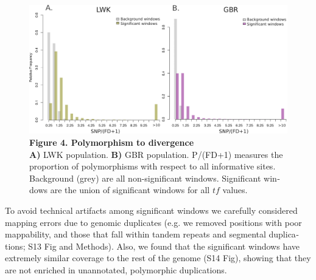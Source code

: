 \begin{refsection}
\begin{otherlanguage}{english}
\begin{figure}[!ht]
\includegraphics[width=\textwidth]{chap2_folder/Figures/Fig4.tiff}
\caption*{\textbf{Figure 4. Polymorphism to divergence}\\
\textbf{A)} LWK population. \textbf{B)} GBR population. P/(FD+1) measures the proportion of polymorphisms with respect to all informative sites. Background (grey) are all non-significant windows. Significant windows are the union of significant windows for all $tf$ values.
}
\end{figure}

To avoid technical artifacts among significant windows we carefully considered mapping errors due to genomic duplicates (e.g. we removed positions with poor mappability, and those that fall within tandem repeats and segmental duplications; S13 Fig and Methods). Also, we found that the significant windows have extremely similar coverage to the rest of the genome (S14 Fig), showing that they are not enriched in unannotated, polymorphic duplications.


\end{otherlanguage}
\end{refsection}
